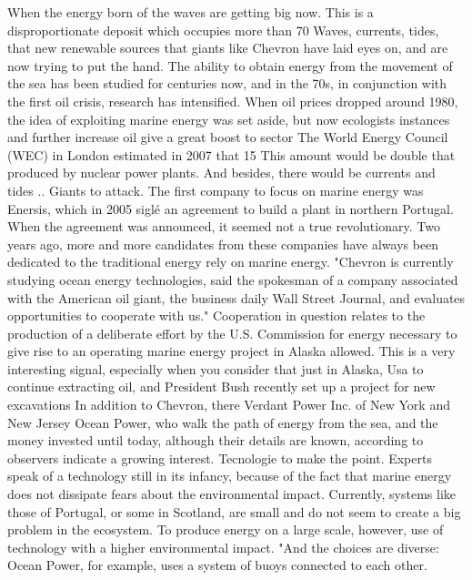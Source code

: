 When the energy born of the waves are getting big now.
This is a disproportionate deposit which occupies more than 70%
Waves, currents, tides, that new renewable sources that giants like Chevron have laid eyes on, and are now trying to put the hand.
The ability to obtain energy from the movement of the sea has been studied for centuries now, and in the 70s, in conjunction with the first oil crisis, research has intensified.
When oil prices dropped around 1980, the idea of ​​exploiting marine energy was set aside, but now ecologists instances and further increase oil give a great boost to sector
The World Energy Council (WEC) in London estimated in 2007 that 15%
This amount would be double that produced by nuclear power plants.
And besides, there would be currents and tides ..
Giants to attack.
The first company to focus on marine energy was Enersis, which in 2005 siglé an agreement to build a plant in northern Portugal.
When the agreement was announced, it seemed not a true revolutionary.
Two years ago, more and more candidates from these companies have always been dedicated to the traditional energy rely on marine energy.
"Chevron is currently studying ocean energy technologies, said the spokesman of a company associated with the American oil giant, the business daily Wall Street Journal, and evaluates opportunities to cooperate with us."
Cooperation in question relates to the production of a deliberate effort by the U.S. Commission for energy necessary to give rise to an operating marine energy project in Alaska allowed.
This is a very interesting signal, especially when you consider that just in Alaska, Usa to continue extracting oil, and President Bush recently set up a project for new excavations
In addition to Chevron, there Verdant Power Inc. of New York and New Jersey Ocean Power, who walk the path of energy from the sea, and the money invested until today, although their details are known, according to observers indicate a growing interest.
Tecnologie to make the point.
Experts speak of a technology still in its infancy, because of the fact that marine energy does not dissipate fears about the environmental impact.
Currently, systems like those of Portugal, or some in Scotland, are small and do not seem to create a big problem in the ecosystem.
To produce energy on a large scale, however, use of technology with a higher environmental impact.
"And the choices are diverse: Ocean Power, for example, uses a system of buoys connected to each other.
